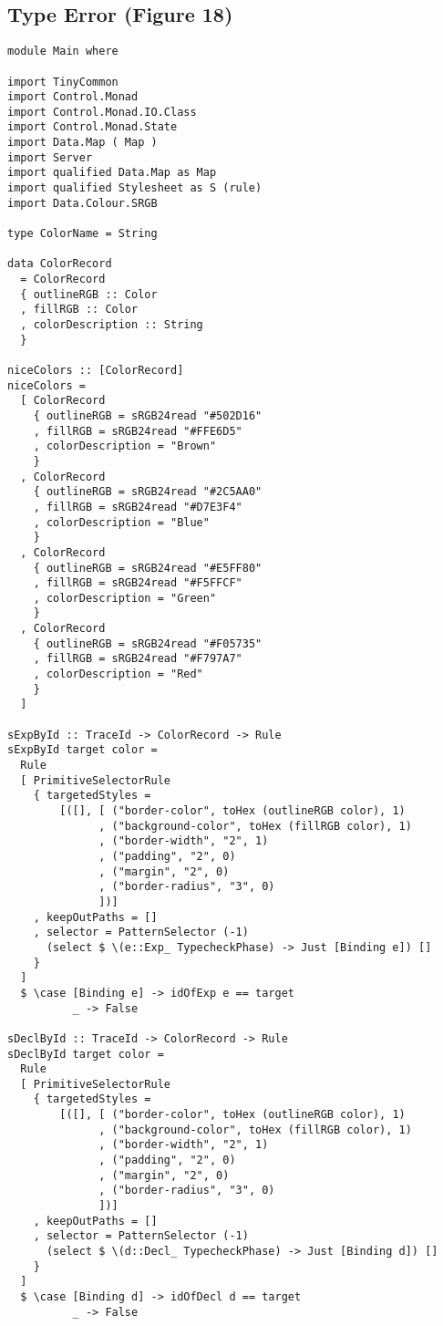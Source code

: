 \documentclass[acmsmall, screen]{acmart}
\begin{document}
\subsection{Type Error (Figure 18)}
\label{sec:listing-type-error}
{\scriptsize
\begin{verbatim}
module Main where

import TinyCommon
import Control.Monad
import Control.Monad.IO.Class
import Control.Monad.State
import Data.Map ( Map )
import Server
import qualified Data.Map as Map
import qualified Stylesheet as S (rule)
import Data.Colour.SRGB

type ColorName = String

data ColorRecord
  = ColorRecord
  { outlineRGB :: Color
  , fillRGB :: Color
  , colorDescription :: String
  }

niceColors :: [ColorRecord]
niceColors =
  [ ColorRecord
    { outlineRGB = sRGB24read "#502D16"
    , fillRGB = sRGB24read "#FFE6D5"
    , colorDescription = "Brown"
    }
  , ColorRecord
    { outlineRGB = sRGB24read "#2C5AA0"
    , fillRGB = sRGB24read "#D7E3F4"
    , colorDescription = "Blue"
    }
  , ColorRecord
    { outlineRGB = sRGB24read "#E5FF80"
    , fillRGB = sRGB24read "#F5FFCF"
    , colorDescription = "Green"
    }
  , ColorRecord
    { outlineRGB = sRGB24read "#F05735"
    , fillRGB = sRGB24read "#F797A7"
    , colorDescription = "Red"
    }
  ]

sExpById :: TraceId -> ColorRecord -> Rule
sExpById target color =
  Rule
  [ PrimitiveSelectorRule
    { targetedStyles =
        [([], [ ("border-color", toHex (outlineRGB color), 1)
              , ("background-color", toHex (fillRGB color), 1)
              , ("border-width", "2", 1)
              , ("padding", "2", 0)
              , ("margin", "2", 0)
              , ("border-radius", "3", 0)
              ])]
    , keepOutPaths = []
    , selector = PatternSelector (-1)
      (select $ \(e::Exp_ TypecheckPhase) -> Just [Binding e]) []
    }
  ]
  $ \case [Binding e] -> idOfExp e == target
          _ -> False

sDeclById :: TraceId -> ColorRecord -> Rule
sDeclById target color =
  Rule
  [ PrimitiveSelectorRule
    { targetedStyles =
        [([], [ ("border-color", toHex (outlineRGB color), 1)
              , ("background-color", toHex (fillRGB color), 1)
              , ("border-width", "2", 1)
              , ("padding", "2", 0)
              , ("margin", "2", 0)
              , ("border-radius", "3", 0)
              ])]
    , keepOutPaths = []
    , selector = PatternSelector (-1)
      (select $ \(d::Decl_ TypecheckPhase) -> Just [Binding d]) []
    }
  ]
  $ \case [Binding d] -> idOfDecl d == target
          _ -> False


\end{verbatim}}
\end{document}
